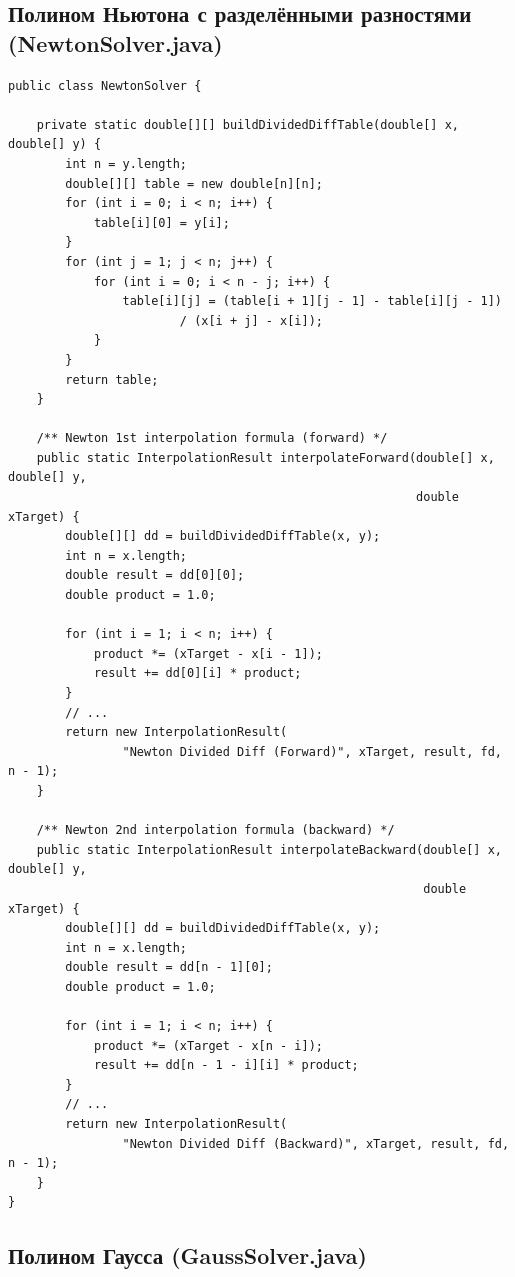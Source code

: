 \subsection{Полином Ньютона с разделёнными разностями (NewtonSolver.java)}

\begin{lstlisting}[style=javaStyle, label=code:newton]
public class NewtonSolver {

    private static double[][] buildDividedDiffTable(double[] x, double[] y) {
        int n = y.length;
        double[][] table = new double[n][n];
        for (int i = 0; i < n; i++) {
            table[i][0] = y[i];
        }
        for (int j = 1; j < n; j++) {
            for (int i = 0; i < n - j; i++) {
                table[i][j] = (table[i + 1][j - 1] - table[i][j - 1])
                        / (x[i + j] - x[i]);
            }
        }
        return table;
    }

    /** Newton 1st interpolation formula (forward) */
    public static InterpolationResult interpolateForward(double[] x, double[] y,
                                                         double xTarget) {
        double[][] dd = buildDividedDiffTable(x, y);
        int n = x.length;
        double result = dd[0][0];
        double product = 1.0;

        for (int i = 1; i < n; i++) {
            product *= (xTarget - x[i - 1]);
            result += dd[0][i] * product;
        }
        // ...
        return new InterpolationResult(
                "Newton Divided Diff (Forward)", xTarget, result, fd, n - 1);
    }

    /** Newton 2nd interpolation formula (backward) */
    public static InterpolationResult interpolateBackward(double[] x, double[] y,
                                                          double xTarget) {
        double[][] dd = buildDividedDiffTable(x, y);
        int n = x.length;
        double result = dd[n - 1][0];
        double product = 1.0;

        for (int i = 1; i < n; i++) {
            product *= (xTarget - x[n - i]);
            result += dd[n - 1 - i][i] * product;
        }
        // ...
        return new InterpolationResult(
                "Newton Divided Diff (Backward)", xTarget, result, fd, n - 1);
    }
}
\end{lstlisting}

\subsection{Полином Гаусса (GaussSolver.java)}

